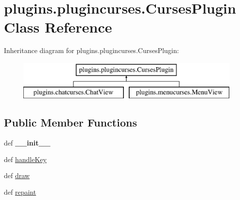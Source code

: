 \hypertarget{classplugins_1_1plugincurses_1_1_curses_plugin}{\section{plugins.\-plugincurses.\-Curses\-Plugin \-Class \-Reference}
\label{classplugins_1_1plugincurses_1_1_curses_plugin}
}
\-Inheritance diagram for plugins.\-plugincurses.\-Curses\-Plugin\-:\begin{figure}[H]
\begin{center}
\leavevmode
\includegraphics[height=2.000000cm]{classplugins_1_1plugincurses_1_1_curses_plugin}
\end{center}
\end{figure}
\subsection*{\-Public \-Member \-Functions}
\begin{DoxyCompactItemize}
\item 
\hypertarget{classplugins_1_1plugincurses_1_1_curses_plugin_a13b389c8fb7ec6c1fd1719cc73fdf5c7}{def {\bfseries \-\_\-\-\_\-init\-\_\-\-\_\-}}\label{classplugins_1_1plugincurses_1_1_curses_plugin_a13b389c8fb7ec6c1fd1719cc73fdf5c7}

\item 
def \hyperlink{classplugins_1_1plugincurses_1_1_curses_plugin_acea30dc25e5a20e911e257845b8ac430}{handle\-Key}
\item 
def \hyperlink{classplugins_1_1plugincurses_1_1_curses_plugin_a54904428b032d020b8c2ad81f03b74f0}{draw}
\item 
def \hyperlink{classplugins_1_1plugincurses_1_1_curses_plugin_a8dcc0fef85a3f25ed661dcdae06e3c40}{repaint}
\end{DoxyCompactItemize}
